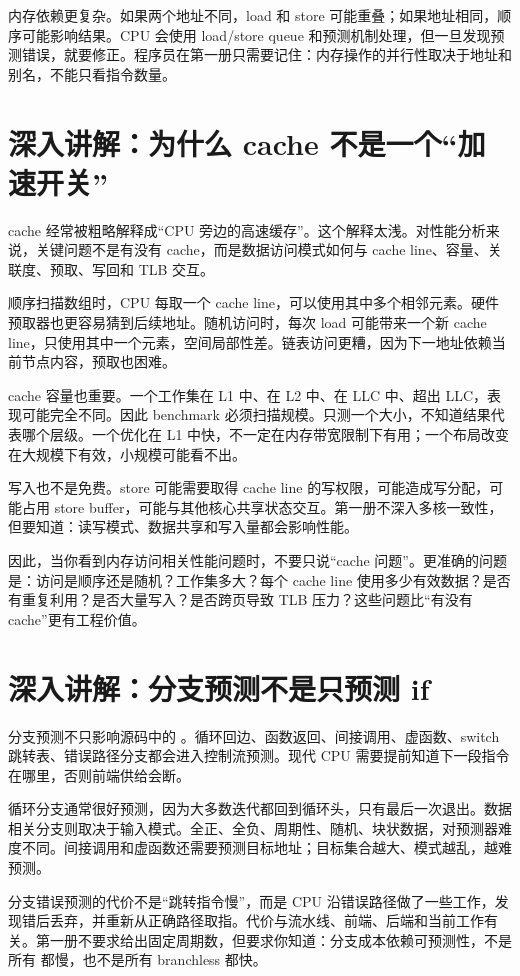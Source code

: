 内存依赖更复杂。如果两个地址不同，load 和 store 可能重叠；如果地址相同，顺序可能影响结果。CPU 会使用 load/store queue 和预测机制处理，但一旦发现预测错误，就要修正。程序员在第一册只需要记住：内存操作的并行性取决于地址和别名，不能只看指令数量。

\section{深入讲解：为什么 cache 不是一个“加速开关”}

cache 经常被粗略解释成“CPU 旁边的高速缓存”。这个解释太浅。对性能分析来说，关键问题不是有没有 cache，而是数据访问模式如何与 cache line、容量、关联度、预取、写回和 TLB 交互。

顺序扫描数组时，CPU 每取一个 cache line，可以使用其中多个相邻元素。硬件预取器也更容易猜到后续地址。随机访问时，每次 load 可能带来一个新 cache line，只使用其中一个元素，空间局部性差。链表访问更糟，因为下一地址依赖当前节点内容，预取也困难。

cache 容量也重要。一个工作集在 L1 中、在 L2 中、在 LLC 中、超出 LLC，表现可能完全不同。因此 benchmark 必须扫描规模。只测一个大小，不知道结果代表哪个层级。一个优化在 L1 中快，不一定在内存带宽限制下有用；一个布局改变在大规模下有效，小规模可能看不出。

写入也不是免费。store 可能需要取得 cache line 的写权限，可能造成写分配，可能占用 store buffer，可能与其他核心共享状态交互。第一册不深入多核一致性，但要知道：读写模式、数据共享和写入量都会影响性能。

因此，当你看到内存访问相关性能问题时，不要只说“cache 问题”。更准确的问题是：访问是顺序还是随机？工作集多大？每个 cache line 使用多少有效数据？是否有重复利用？是否大量写入？是否跨页导致 TLB 压力？这些问题比“有没有 cache”更有工程价值。

\section{深入讲解：分支预测不是只预测 if}

分支预测不只影响源码中的 。循环回边、函数返回、间接调用、虚函数、switch 跳转表、错误路径分支都会进入控制流预测。现代 CPU 需要提前知道下一段指令在哪里，否则前端供给会断。

循环分支通常很好预测，因为大多数迭代都回到循环头，只有最后一次退出。数据相关分支则取决于输入模式。全正、全负、周期性、随机、块状数据，对预测器难度不同。间接调用和虚函数还需要预测目标地址；目标集合越大、模式越乱，越难预测。

分支错误预测的代价不是“跳转指令慢”，而是 CPU 沿错误路径做了一些工作，发现错后丢弃，并重新从正确路径取指。代价与流水线、前端、后端和当前工作有关。第一册不要求给出固定周期数，但要求你知道：分支成本依赖可预测性，不是所有  都慢，也不是所有 branchless 都快。

